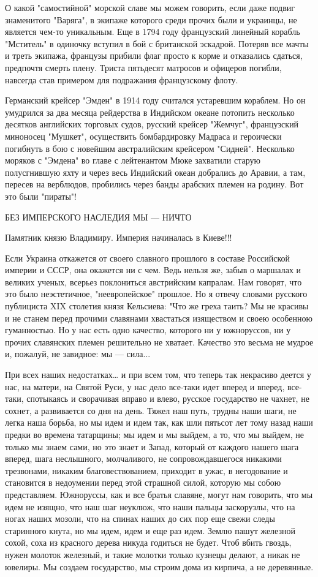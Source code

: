 О какой "самостийной" морской славе мы можем говорить, если даже подвиг
знаменитого "Варяга", в экипаже которого среди прочих были и украинцы, не
является чем-то уникальным. Еще в 1794 году французский линейный корабль
"Мститель" в одиночку вступил в бой с британской эскадрой. Потеряв все мачты и
треть экипажа, французы прибили флаг просто к корме и отказались сдаться,
предпочтя смерть плену. Триста пятьдесят матросов и офицеров погибли, навсегда
став примером для подражания французскому флоту.

Германский крейсер "Эмден" в 1914 году считался устаревшим кораблем. Но он
умудрился за два месяца рейдерства в Индийском океане потопить несколько
десятков английских торговых судов, русский крейсер "Жемчуг", французский
миноносец "Мушкет", осуществить бомбардировку Мадраса и героически погибнуть в
бою с новейшим австралийским крейсером "Сидней". Несколько моряков с "Эмдена"
во главе с лейтенантом Мюке захватили старую полусгнившую яхту и через весь
Индийский океан добрались до Аравии, а там, пересев на верблюдов, пробились
через банды арабских племен на родину. Вот это были "пираты"!

БЕЗ ИМПЕРСКОГО НАСЛЕДИЯ МЫ — НИЧТО 

Памятник князю Владимиру. Империя начиналась в Киеве!!!

Если Украина откажется от своего славного прошлого в составе Российской империи
и СССР, она окажется ни с чем. Ведь нельзя же, забыв о маршалах и великих
ученых, всерьез поклониться австрийским капралам. Нам говорят, что это было
неэстетичное, "неевропейское" прошлое. Но я отвечу словами русского публициста
XIX столетия князя Кельсиева: "Что же греха таить? Мы не красивы и не станем
перед прочими славянами хвастаться изяществом и своею особенною гуманностью. Но
у нас есть одно качество, которого ни у южноруссов, ни у прочих славянских
племен решительно не хватает. Качество это весьма не мудрое и, пожалуй, не
завидное: мы — сила...

При всех наших недостатках… и при всем том, что теперь так некрасиво деется у
нас, на матери, на Святой Руси, у нас дело все-таки идет вперед и вперед,
все-таки, спотыкаясь и сворачивая вправо и влево, русское государство не
чахнет, не сохнет, а развивается со дня на день. Тяжел наш путь, трудны наши
шаги, не легка наша борьба, но мы идем и идем так, как шли пятьсот лет тому
назад наши предки во времена татарщины; мы идем и мы выйдем, а то, что мы
выйдем, не только мы знаем сами, но это знает и Запад, который от каждого
нашего шага вперед, шага неслышного, молчаливого, не сопровождавшегося никакими
трезвонами, никаким благовествованием, приходит в ужас, в негодование и
становится в недоумении перед этой страшной силой, которую мы собою
представляем. Южноруссы, как и все братья славяне, могут нам говорить, что мы
идем не изящно, что наш шаг неуклюж, что наши пальцы заскорузлы, что на ногах
наших мозоли, что на спинах наших до сих пор еще свежи следы старинного кнута,
но мы идем, идем и еще раз идем. Землю пашут железной сохой, соха из красного
дерева никуда годиться не будет. Чтоб вбить гвоздь, нужен молоток железный, и
такие молотки только кузнецы делают, а никак не ювелиры. Мы создаем
государство, мы строим дома из кирпича, а не деревянные.

